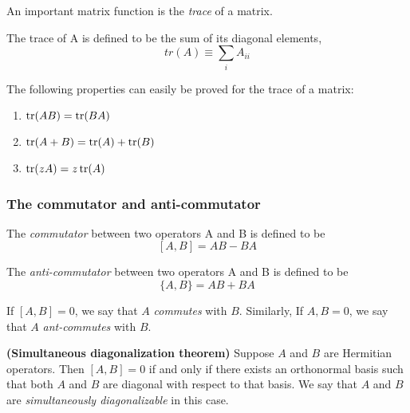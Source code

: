 An important matrix function is the \textit{trace} of a matrix.
\begin{definition}
    The trace of A is defined to be the sum of its diagonal elements,
    $$tr(A) \equiv \sum_{i}{A_{ii}}$$
\end{definition}
The following properties can easily be proved for the trace of a matrix:
\begin{enumerate}
    \item $\tr(AB) = \tr(BA)$
    \item $\tr(A + B) = \tr(A) + \tr(B)$
    \item $\tr(zA) = z\tr(A)$
\end{enumerate}

\subsubsection{The commutator and anti-commutator}
\begin{definition}
    The \textit{commutator} between two operators A and B is defined to be
    $$[A, B] = AB - BA$$
\end{definition}
\begin{definition}
    The \textit{anti-commutator} between two operators A and B is defined to be
    $$\{A, B\} = AB + BA$$
\end{definition}
If $[A, B] = 0$, we say that $A$ \textit{commutes} with $B$. Similarly, If ${A, B} = 0$, we say that $A$ \textit{ant-commutes} with $B$.
\begin{theorem}
    \textbf{(Simultaneous diagonalization theorem)} Suppose $A$ and $B$ are Hermitian operators. Then $[A, B] = 0$ if and only if there exists an orthonormal basis such that both $A$ and $B$ are diagonal with respect to that basis. We say that $A$ and $B$ are \textit{simultaneously diagonalizable} in this case.
\end{theorem}
